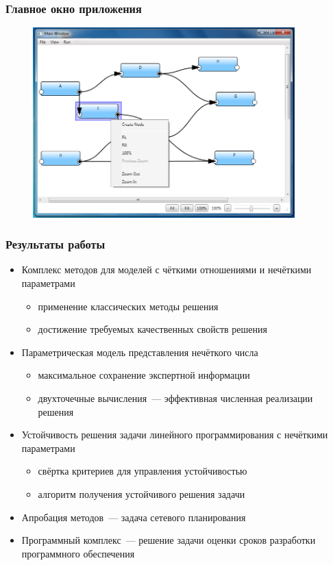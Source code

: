 \documentclass[12pt]{beamer}
\begin{document}
\begin{frame}
  \frametitle{Главное окно приложения}
  \begin{figure}
    \center
    \includegraphics[width=0.9\textwidth]{app-sample-graph.png}
  \end{figure}
\end{frame}


\begin{frame}
  \frametitle{Результаты работы}
  \begin{itemize}
    \item Комплекс методов для моделей с чёткими отношениями и нечёткими параметрами
    \begin{itemize}
      \item применение классических методы решения
      \item достижение требуемых качественных свойств решения
    \end{itemize}
    \item Параметрическая модель представления нечёткого числа
    \begin{itemize}
      \item максимальное сохранение экспертной информации
      \item двухточечные вычисления~--- эффективная численная реализации решения
    \end{itemize}
    \item Устойчивость решения задачи линейного программирования с нечёткими параметрами
    \begin{itemize}
      \item свёртка критериев для управления устойчивостью
      \item алгоритм получения устойчивого решения задачи
    \end{itemize}
    \item Апробация методов~--- задача сетевого планирования
    \item Программный комплекс~--- решение задачи оценки сроков разработки программного обеспечения
  \end{itemize}
\end{frame}
\end{document}
